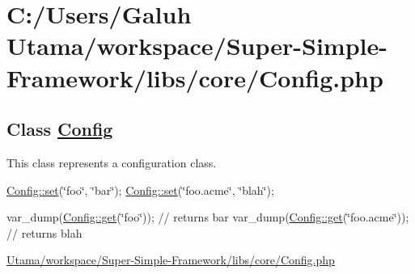 \hypertarget{_c_1_2_users_2_galuh_01_utama_2workspace_2_super-_simple-_framework_2libs_2core_2_config_8php-example}{\section{\-C\-:/\-Users/\-Galuh Utama/workspace/\-Super-\/\-Simple-\/\-Framework/libs/core/\-Config.\-php}
}
\subsection*{\-Class \hyperlink{class_config}{\-Config}}

\-This class represents a configuration class. 

\hyperlink{class_config_aa485369b2925858d92e468d405bd0798}{\-Config\-::set}(\char`\"{}foo\char`\"{}, \char`\"{}bar\char`\"{}); \hyperlink{class_config_aa485369b2925858d92e468d405bd0798}{\-Config\-::set}(\char`\"{}foo.\-acme\char`\"{}, \char`\"{}blah\char`\"{});

var\-\_\-dump(\hyperlink{class_config_a15e2679f2a8f6fa4d60757f4d65413ac}{\-Config\-::get}(\char`\"{}foo\char`\"{})); // returns bar var\-\_\-dump(\hyperlink{class_config_a15e2679f2a8f6fa4d60757f4d65413ac}{\-Config\-::get}(\char`\"{}foo.\-acme\char`\"{})); // returns blah


\begin{DoxyCodeInclude}
\end{DoxyCodeInclude}
 \hyperlink{_config_8php_source}{\-Utama/workspace/\-Super-\/\-Simple-\/\-Framework/libs/core/\-Config.\-php} 